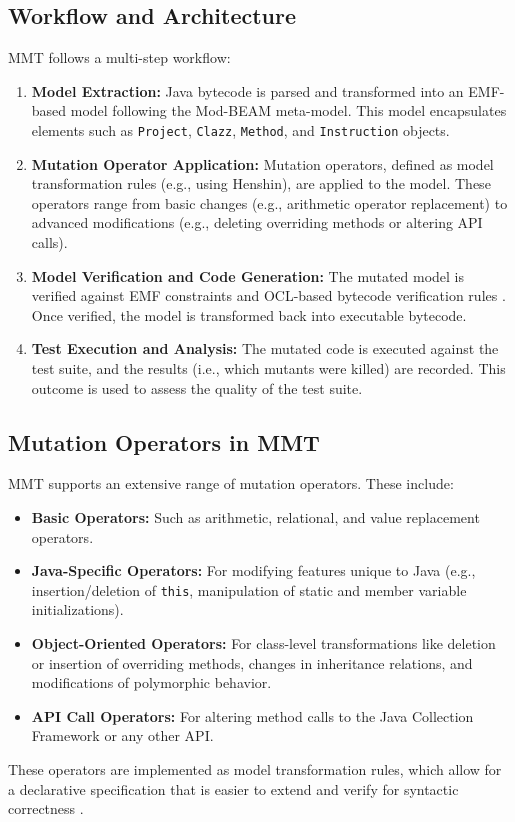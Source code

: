 \documentclass[sigplan, nonacm]{acmart}
\begin{document}
\subsection{Workflow and Architecture}
MMT follows a multi-step workflow:
\begin{enumerate}[noitemsep]
    \item \textbf{Model Extraction:} Java bytecode is parsed and transformed into an EMF-based model following the Mod-BEAM meta-model. This model encapsulates elements such as \texttt{Project}, \texttt{Clazz}, \texttt{Method}, and \texttt{Instruction} objects.
    \item \textbf{Mutation Operator Application:} Mutation operators, defined as model transformation rules (e.g., using Henshin), are applied to the model. These operators range from basic changes (e.g., arithmetic operator replacement) to advanced modifications (e.g., deleting overriding methods or altering API calls).
    \item \textbf{Model Verification and Code Generation:} The mutated model is verified against EMF constraints and OCL-based bytecode verification rules \cite{Bockisch2024demonstration}. Once verified, the model is transformed back into executable bytecode.
    \item \textbf{Test Execution and Analysis:} The mutated code is executed against the test suite, and the results (i.e., which mutants were killed) are recorded. This outcome is used to assess the quality of the test suite.
\end{enumerate}

\subsection{Mutation Operators in MMT}
MMT supports an extensive range of mutation operators. These include:
\begin{itemize}[noitemsep]
    \item \textbf{Basic Operators:} Such as arithmetic, relational, and value replacement operators.
    \item \textbf{Java-Specific Operators:} For modifying features unique to Java (e.g., insertion/deletion of \texttt{this}, manipulation of static and member variable initializations).
    \item \textbf{Object-Oriented Operators:} For class-level transformations like deletion or insertion of overriding methods, changes in inheritance relations, and modifications of polymorphic behavior.
    \item \textbf{API Call Operators:} For altering method calls to the Java Collection Framework or any other API.
\end{itemize}
These operators are implemented as model transformation rules, which allow for a declarative specification that is easier to extend and verify for syntactic correctness \cite{Bockisch2024}.
\end{document}
